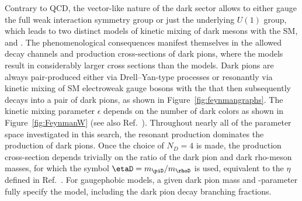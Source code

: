 Contrary to QCD, the vector-like nature of the dark sector allows to either gauge the full \sul weak interaction symmetry group or just the underlying $U(1)$ group, which leads to two distinct models of kinetic mixing of dark mesons with the SM, \sul and \sur. 
The phenomenological consequences manifest themselves in the allowed decay channels and production cross-sections of dark pions, where the \sul models result in considerably larger cross sections than the \sur models.
Dark pions are always pair-produced either via Drell--Yan-type processes or resonantly via kinetic mixing of SM electroweak gauge bosons with the \rhoD that then subsequently decays into a pair of dark pions, as shown in 
Figure~\ref{fig:feynmangraphs}. The kinetic mixing parameter $\epsilon$ 
depends on the number of dark colors as shown in Figure~\ref{fig:FeynmanW} (see also Ref.~\cite{Kribs:2018ilo}).
Throughout nearly all of the parameter space investigated in this search, the resonant production dominates the production of dark pions.
Once the choice of $N_D=4$ is made, the production cross-section depends trivially on the ratio of the dark pion and dark rho-meson masses, for which the symbol $\etaD=m_{\piD}/m_{\rhoD}$ is used, equivalent to the $\eta$ defined in Ref.~\cite{Kribs:2018ilo}. For gaugephobic \sul models, a given dark pion mass and \etaD-parameter fully specify the model, including the dark pion decay branching fractions.


